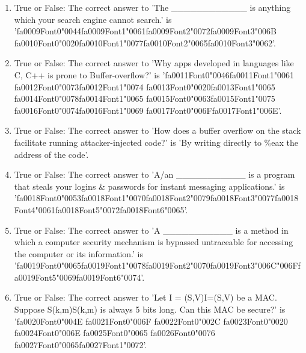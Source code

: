 \documentclass[12pt]{article}
\begin{document}
\begin{enumerate}[label=\arabic*.]
\item True or False: The correct answer to 'The \_\_\_\_\_\_\_\_\_\_\_\_ is anything which your search engine cannot search.' is '{\csname fa0009Font0\endcsname\char"0044}{\csname fa0009Font1\endcsname\char"0061}{\csname fa0009Font2\endcsname\char"0072}{\csname fa0009Font3\endcsname\char"006B} {\csname fa0010Font0\endcsname\char"0020}{\csname fa0010Font1\endcsname\char"0077}{\csname fa0010Font2\endcsname\char"0065}{\csname fa0010Font3\endcsname\char"0062}'.
\item True or False: The correct answer to 'Why apps developed in languages like C, C++ is prone to Buffer-overflow?' is '{\csname fa0011Font0\endcsname\char"0046}{\csname fa0011Font1\endcsname\char"0061} {\csname fa0012Font0\endcsname\char"0073}{\csname fa0012Font1\endcsname\char"0074} {\csname fa0013Font0\endcsname\char"0020}{\csname fa0013Font1\endcsname\char"0065} {\csname fa0014Font0\endcsname\char"0078}{\csname fa0014Font1\endcsname\char"0065} {\csname fa0015Font0\endcsname\char"0063}{\csname fa0015Font1\endcsname\char"0075} {\csname fa0016Font0\endcsname\char"0074}{\csname fa0016Font1\endcsname\char"0069} {\csname fa0017Font0\endcsname\char"006F}{\csname fa0017Font1\endcsname\char"006E}'.
\item True or False: The correct answer to 'How does a buffer overflow on the stack facilitate running attacker-injected code?' is 'By writing directly to \%eax the address of the code'.
\item True or False: The correct answer to 'A/an \_\_\_\_\_\_\_\_\_\_\_ is a program that steals your logins \& passwords for instant messaging applications.' is '{\csname fa0018Font0\endcsname\char"0053}{\csname fa0018Font1\endcsname\char"0070}{\csname fa0018Font2\endcsname\char"0079}{\csname fa0018Font3\endcsname\char"0077}{\csname fa0018Font4\endcsname\char"0061}{\csname fa0018Font5\endcsname\char"0072}{\csname fa0018Font6\endcsname\char"0065}'.
\item True or False: The correct answer to 'A \_\_\_\_\_\_\_\_\_\_\_ is a method in which a computer security mechanism is bypassed untraceable for accessing the computer or its information.' is '{\csname fa0019Font0\endcsname\char"0065}{\csname fa0019Font1\endcsname\char"0078}{\csname fa0019Font2\endcsname\char"0070}{\csname fa0019Font3\endcsname\char"006C}{\char"006F}{\csname fa0019Font5\endcsname\char"0069}{\csname fa0019Font6\endcsname\char"0074}'.
\item True or False: The correct answer to 'Let I = (S,V)I=(S,V) be a MAC. Suppose S(k,m)S(k,m) is always 5 bits long. Can this MAC be secure?' is '{\csname fa0020Font0\endcsname\char"004E} {\csname fa0021Font0\endcsname\char"006F} {\csname fa0022Font0\endcsname\char"002C} {\csname fa0023Font0\endcsname\char"0020} {\csname fa0024Font0\endcsname\char"006E} {\csname fa0025Font0\endcsname\char"0065} {\csname fa0026Font0\endcsname\char"0076} {\csname fa0027Font0\endcsname\char"0065}{\csname fa0027Font1\endcsname\char"0072}'.
\end{enumerate}
\end{document}
